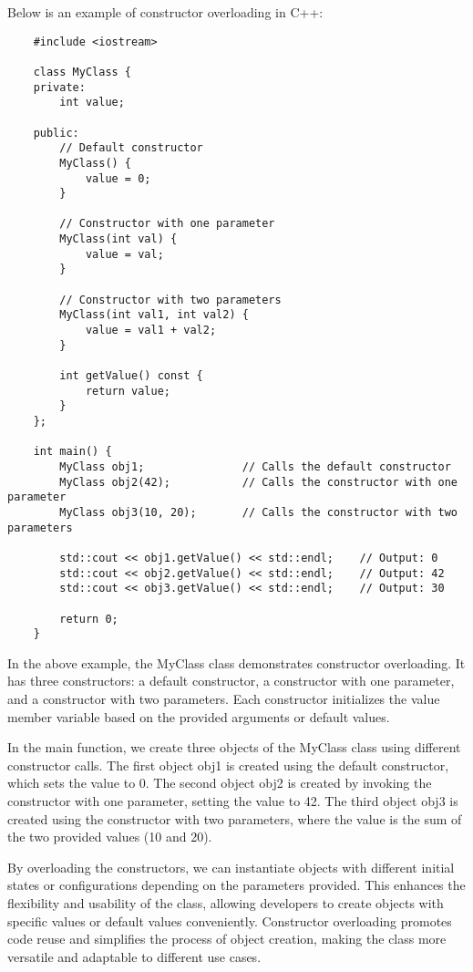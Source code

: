\begin{solution}
    Below is an example of constructor overloading in C++: \\
    \horizontalline
    \begin{verbatim}
    #include <iostream>
    
    class MyClass {
    private:
        int value;
    
    public:
        // Default constructor
        MyClass() {
            value = 0;
        }
    
        // Constructor with one parameter
        MyClass(int val) {
            value = val;
        }
    
        // Constructor with two parameters
        MyClass(int val1, int val2) {
            value = val1 + val2;
        }
    
        int getValue() const {
            return value;
        }
    };
    
    int main() {
        MyClass obj1;               // Calls the default constructor
        MyClass obj2(42);           // Calls the constructor with one parameter
        MyClass obj3(10, 20);       // Calls the constructor with two parameters
    
        std::cout << obj1.getValue() << std::endl;    // Output: 0
        std::cout << obj2.getValue() << std::endl;    // Output: 42
        std::cout << obj3.getValue() << std::endl;    // Output: 30
    
        return 0;
    }
    \end{verbatim}
    
    \horizontalline

    In the above example, the MyClass class demonstrates constructor overloading. It has three constructors: a default constructor, a constructor with one parameter, and a constructor with two parameters. Each constructor initializes the value member variable based on the provided arguments 
    or default values.

    \noindent In the main function, we create three objects of the MyClass class using different constructor calls. The first object obj1 is created using the default constructor, which sets the value to 0. The second object obj2 is created by invoking the constructor with one parameter, 
    setting the value to 42. The third object obj3 is created using the constructor with two parameters, where the value is the sum of the two provided values (10 and 20).

    \noindent By overloading the constructors, we can instantiate objects with different initial states or configurations depending on the parameters provided. This enhances the flexibility and usability of the class, allowing developers to create objects with specific values or default values 
    conveniently. Constructor overloading promotes code reuse and simplifies the process of object creation, making the class more versatile and adaptable to different use cases.
\end{solution}

